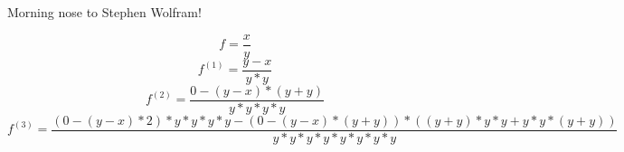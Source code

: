 \documentclass[12pt,a4paper]{scrartcl}
\begin{document}
\begin{center}Morning nose to Stephen Wolfram!
\end{center}\begin{equation}\label{eq:solv}
 f = \frac{x}{y}
\end{equation}
\begin{equation}\label{eq:solv}
 f^{(1)} = \frac{y-x}{y*y}
\end{equation}
\begin{equation}\label{eq:solv}
 f^{(2)} = \frac{0-(y-x)*(y+y)}{y*y*y*y}
\end{equation}
\begin{equation}\label{eq:solv}
 f^{(3)} = \frac{(0-(y-x)*2)*y*y*y*y-(0-(y-x)*(y+y))*((y+y)*y*y+y*y*(y+y))}{y*y*y*y*y*y*y*y}
\end{equation}
\end{document}
